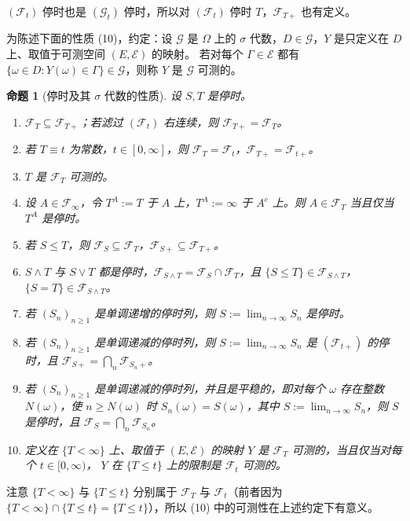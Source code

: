 \documentclass[UTF8,11pt,a4paper,oneside,fontset=fandol]{ctexrep}
\numberwithin{equation}{section}
\theoremstyle{zhthm}
\newtheorem{proposition}[theorem]{命题}
\newcommand{\F}{\mathcal{F}}
\newcommand{\G}{\mathcal{G}}
\begin{document}
$(\F_t)$ 停时也是 $(\G_t)$ 停时，所以对 $(\F_t)$ 停时 $T$，$\F_{T+}$ 也有定义。

为陈述下面的性质 (10)，约定：设 $\G$ 是 $\Omega$ 上的 $\sigma$ 代数，$D\in\G$，$Y$ 是只定义在 $D$ 上、取值于可测空间 $(E,\mathcal E)$ 的映射。
若对每个 $\Gamma\in\mathcal E$ 都有 $\{\omega\in D:Y(\omega)\in\Gamma\}\in\G$，则称 $Y$ 是 $\G$ 可测的。

\begin{proposition}[停时及其 $\sigma$ 代数的性质]
\label{prop:stopping-time-properties}
设 $S,T$ 是停时。
\begin{enumerate}[label=(\arabic*)]
  \item $\F_T\subseteq\F_{T+}$；若滤过 $(\F_t)$ 右连续，则 $\F_{T+}=\F_T$。
  \item 若 $T\equiv t$ 为常数，$t\in[0,\infty]$，则 $\F_T=\F_t$，$\F_{T+}=\F_{t+}$。
  \item $T$ 是 $\F_T$ 可测的。
  \item 设 $A\in\F_\infty$，令 $T^A:=T$ 于 $A$ 上，$T^A:=\infty$ 于 $A^c$ 上。则 $A\in\F_T$ 当且仅当 $T^A$ 是停时。
  \item 若 $S\le T$，则 $\F_S\subseteq\F_T$，$\F_{S+}\subseteq\F_{T+}$。
  \item $S\wedge T$ 与 $S\vee T$ 都是停时，$\F_{S\wedge T}=\F_S\cap\F_T$，且 $\{S\le T\}\in\F_{S\wedge T}$，$\{S=T\}\in\F_{S\wedge T}$。
  \item 若 $(S_n)_{n\ge1}$ 是单调递增的停时列，则 $S:=\lim_{n\to\infty}S_n$ 是停时。
  \item 若 $(S_n)_{n\ge1}$ 是单调递减的停时列，则 $S:=\lim_{n\to\infty}S_n$ 是 $(\F_{t+})$ 的停时，且 $\F_{S+}=\bigcap_n\F_{S_n+}$。
  \item 若 $(S_n)_{n\ge1}$ 是单调递减的停时列，并且是平稳的，即对每个 $\omega$ 存在整数 $N(\omega)$，使 $n\ge N(\omega)$ 时
    $S_n(\omega)=S(\omega)$，其中 $S:=\lim_{n\to\infty}S_n$，则 $S$ 是停时，且 $\F_S=\bigcap_n\F_{S_n}$。
  \item 定义在 $\{T<\infty\}$ 上、取值于 $(E,\mathcal E)$ 的映射 $Y$ 是 $\F_T$ 可测的，当且仅当对每个 $t\in[0,\infty)$，
    $Y$ 在 $\{T\le t\}$ 上的限制是 $\F_t$ 可测的。
\end{enumerate}
\end{proposition}

注意 $\{T<\infty\}$ 与 $\{T\le t\}$ 分别属于 $\F_T$ 与 $\F_t$（前者因为 $\{T<\infty\}\cap\{T\le t\}=\{T\le t\}$），所以 (10) 中的可测性在上述约定下有意义。
\end{document}

